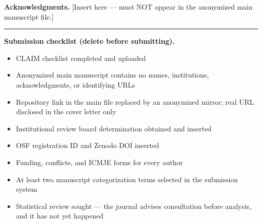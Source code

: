 \documentclass[11pt]{article}
\begin{document}
\bigskip
\noindent\textbf{Acknowledgments.}
[Insert here --- must NOT appear in the anonymized main manuscript file.]

\bigskip
\hrule
\bigskip

\noindent\textbf{Submission checklist (delete before submitting).}
\begin{itemize}\itemsep0pt
  \item[$\square$] CLAIM checklist completed and uploaded
  \item[$\square$] Anonymized main manuscript contains no names, institutions,
    acknowledgments, or identifying URLs
  \item[$\square$] Repository link in the main file replaced by an anonymized
    mirror; real URL disclosed in the cover letter only
  \item[$\square$] Institutional review board determination obtained and inserted
  \item[$\square$] OSF registration ID and Zenodo DOI inserted
  \item[$\square$] Funding, conflicts, and ICMJE forms for every author
  \item[$\square$] At least two manuscript categorization terms selected in the
    submission system
  \item[$\square$] Statistical review sought --- the journal advises consultation
    before analysis, and it has not yet happened
\end{itemize}
\end{document}
